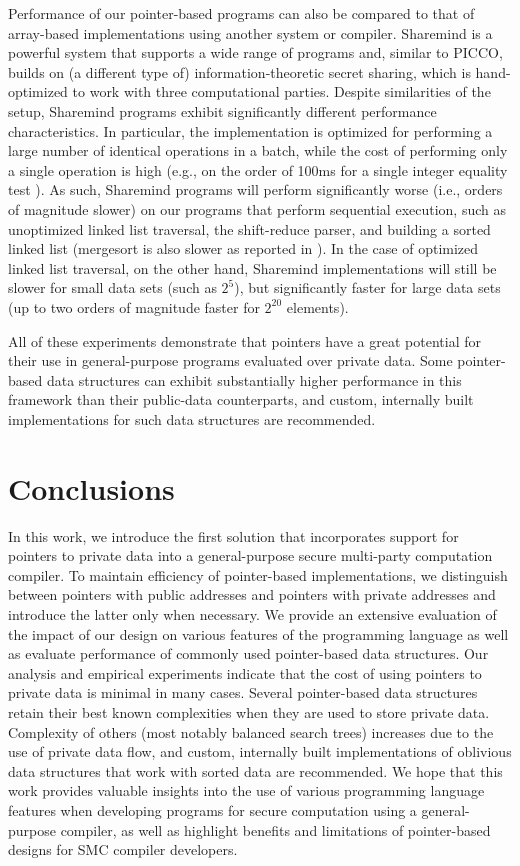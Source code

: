 \documentclass[11pt]{article}
\begin{document}
Performance of our pointer-based programs can also be compared to that of
array-based implementations using another system or compiler. Sharemind
\cite{Bogdanov08} is a powerful system that supports a wide range of
programs and, similar to PICCO, builds on (a different type of)
information-theoretic secret sharing, which is hand-optimized to work with
three computational parties. Despite similarities of the setup, Sharemind
programs exhibit significantly different performance characteristics. In
particular, the implementation is optimized for performing a large number of
identical operations in a batch, while the cost of performing only a single
operation is high (e.g., on the order of 100ms for a single integer equality
test \cite{bog12}). As such, Sharemind programs will perform significantly
worse (i.e., orders of magnitude slower) on our programs that perform
sequential execution, such as unoptimized linked list traversal, the
shift-reduce parser, and building a sorted linked list (mergesort is also
slower as reported in \cite{zha13}). In the case of optimized linked list
traversal, on the other hand, Sharemind implementations will still be slower
for small data sets (such as $2^5$), but significantly faster for large data
sets (up to two orders of magnitude faster for $2^{20}$ elements).

All of these experiments demonstrate that pointers have a great potential
for their use in general-purpose programs evaluated over private data. Some
pointer-based data structures can exhibit substantially higher performance
in this framework than their public-data counterparts, and custom,
internally built implementations for such data structures are recommended. 

\section{Conclusions} 
\label{sec:conclusions}

In this work, we introduce the first solution that incorporates support for
pointers to private data into a general-purpose secure multi-party
computation compiler. To maintain efficiency of pointer-based
implementations, we distinguish between pointers with public addresses and
pointers with private addresses and introduce the latter only when
necessary. We provide an extensive evaluation of the impact of our design on
various features of the programming language as well as evaluate performance
of commonly used pointer-based data structures. Our analysis and empirical
experiments indicate that the cost of using pointers to private data is
minimal in many cases. Several pointer-based data structures retain their
best known complexities when they are used to store private data. Complexity
of others (most notably balanced search trees) increases due to the use of
private data flow, and custom, internally built implementations of oblivious
data structures that work with sorted data are recommended. We hope that
this work provides valuable insights into the use of various programming
language features when developing programs for secure computation using a
general-purpose compiler, as well as highlight benefits and limitations of
pointer-based designs for SMC compiler developers.
\end{document}
